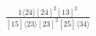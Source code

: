 \documentclass[varwidth, border=5pt]{standalone}
\begin{document}
\begin{my}
$\begin{gathered}
\scriptscriptstyle\frac{1⟨24⟩[24]^2[13]^2}{[15]⟨23⟩[23]^2[25]⟨34⟩}
\end{gathered}$
\end{my}
\end{document}
